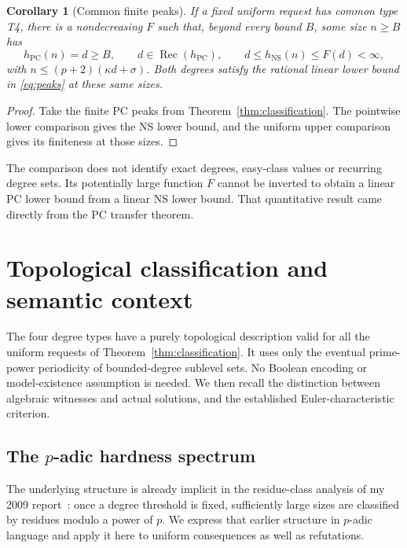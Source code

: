 \documentclass[11pt,a4paper]{article}
\newtheorem{corollary}[theorem]{Corollary}
\theoremstyle{definition}\newtheorem{definition}[theorem]{Definition}
\theoremstyle{remark}\newtheorem{remark}[theorem]{Remark}
\newcommand{\NS}{\mathrm{NS}}\newcommand{\PC}{\mathrm{PC}}
\DeclareMathOperator{\rec}{Rec}\DeclareMathOperator{\Soc}{Soc}\DeclareMathOperator{\Top}{Top}\DeclareMathOperator{\LIS}{LIS}
\begin{document}
\begin{corollary}[Common finite peaks]\label{cor:common-peaks}
If a fixed uniform request has common type T4, there is a nondecreasing
$F$ such that, beyond every bound $B$, some size $n\ge B$ has
\[
 h_{\PC}(n)=d\ge B,\qquad d\in\rec(h_{\PC}),\qquad
 d\le h_{\NS}(n)\le F(d)<\infty,
\]
with $n\le(p+2)(\kappa d+\sigma)$. Both degrees satisfy the rational
linear lower bound in \eqref{eq:peaks} at these same sizes.
\end{corollary}
\begin{proof}
Take the finite PC peaks from Theorem~\ref{thm:classification}.
The pointwise lower comparison gives the NS lower bound, and the uniform
upper comparison gives its finiteness at those sizes.
\end{proof}

The comparison does not identify exact degrees, easy-class values or
recurring degree sets. Its potentially large function $F$ cannot be
inverted to obtain a linear PC lower bound from a linear NS lower bound.
That quantitative result came directly from the PC transfer theorem.

\section{Topological classification and semantic context}
\label{sec:model-theory}
The four degree types have a purely topological description valid for
all the uniform requests of Theorem~\ref{thm:classification}. It uses
only the eventual prime-power periodicity of bounded-degree
sublevel sets. No Boolean encoding or model-existence assumption is
needed. We then recall the distinction between algebraic witnesses
and actual solutions, and the established Euler-characteristic criterion.

\subsection{The \texorpdfstring{$p$}{p}-adic hardness spectrum}
\label{sec:topological-spectrum}
The underlying structure is already implicit in the residue-class
analysis of my 2009 report~\cite[Section~4, pp.~18--19]{RiisLong}:
once a degree threshold is fixed, sufficiently large sizes are classified
by residues modulo a power of $p$. We express that earlier structure
in $p$-adic language and apply it here to uniform consequences as well
as refutations.
\end{document}

